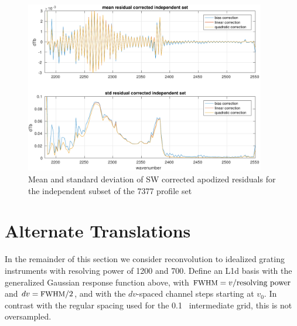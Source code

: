 \documentclass[11pt]{article}
\begin{document}
\begin{figure} %
  \centering
  \includegraphics[height=7.5cm]{figures/a2cris_stat_SW.pdf}
  \caption{Mean and standard deviation of SW corrected apodized
    residuals for the independent subset of the 7377 profile set}
  \label{statSW}
\end{figure}

% 
% 
% 

\FloatBarrier
\section{Alternate Translations}
\label{alttrans}

In the remainder of this section we consider reconvolution to
idealized grating instruments with resolving power of 1200 and 700.
Define an {\airs} L1d basis with the generalized Gaussian response
function above, with $\mbox{\small FWHM} = v / \hbox{resolving power}$ and $dv =
\mbox{\small FWHM} / 2$, and with the $dv$-spaced channel steps starting at
$v_0$.  In contrast with the regular spacing used for the {0.1~\wn}
intermediate grid, this is not oversampled.

\end{document}

